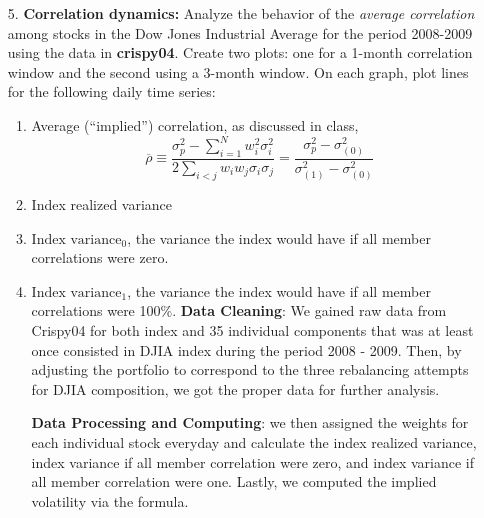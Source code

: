 \documentclass[10pt]{article}
\begin{document}
\begin{enumerate}
\begin{enumerate}
\begin{proof}[Answer]
        
        
        
        
        As seen from the plot, the exposure in absolute value stayed low before mid-2007 and started increasing steadily since then.
        
        \end{proof}
    \end{enumerate}


    \item[5.] \textbf{Correlation dynamics:} Analyze the behavior of the \textit{average correlation} among stocks in the Dow Jones Industrial Average for the period 2008-2009 using the data in \textbf{crispy04}. Create two plots: one for a 1-month correlation window and the second using a 3-month window. On each graph, plot lines for the following daily time series:
    \begin{enumerate}
        \item Average (``implied'') correlation, as discussed in class,
        $$ \overline{\rho} \equiv \dfrac{\sigma_p^2 - \sum_{i=1}^N w_i^2\sigma_i^2}{2\sum_{i<j} w_iw_j \sigma_i\sigma_j} = \dfrac{\sigma_p^2 - \sigma_{(0)}^2}{\sigma_{(1)}^2 - \sigma_{(0)}^2}$$
    
        
        \item Index realized variance 
        \item $\textrm{Index variance}_0$, the variance the index would have if all member correlations were zero.
              
        \item $\textrm{Index variance}_1$, the variance the index would have if all member correlations were 100\%.
        \smallskip
        \textbf{Data Cleaning}:  We gained raw data from Crispy04 for both index and 35 individual components that was at least once consisted in DJIA index during the period 2008 - 2009. Then, by adjusting the portfolio to correspond to the three rebalancing attempts for DJIA composition, we got the proper data for further analysis. 
        
        \smallskip
        \textbf{Data Processing and Computing}:
        we then assigned the weights for each individual stock everyday and calculate the index realized variance, index variance if all member correlation were zero, and index variance if all member correlation were one. Lastly, we computed the implied volatility via the formula. 
        

\end{enumerate}
\end{enumerate}
\end{document}
